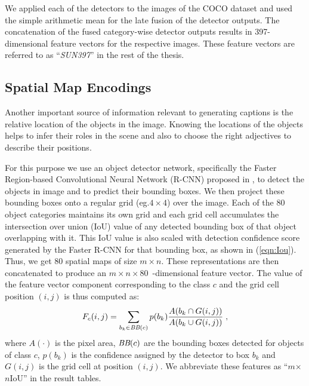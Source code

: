 We applied each of the detectors to the images of the COCO dataset and used the
simple arithmetic mean for the late fusion of the detector outputs.
The concatenation of the fused category-wise detector outputs results in
397-dimensional feature vectors for the respective images.
These feature vectors are referred to as ``\emph{SUN397}'' in the rest of the
thesis.

\subsection{Spatial Map Encodings}
\label{sec:frcnnfeat}
Another important source of information relevant to generating captions is the
relative location of the objects in the image. 
Knowing the locations of the objects helps to infer their roles in the scene and
also to choose the right adjectives to describe their positions.

For this purpose we use an object detector network, specifically the Faster
Region-based Convolutional Neural Network (R-CNN) proposed in
\cite{ren15fasterrcnn}, to detect the objects in image and to predict their
bounding boxes.
We then project these bounding boxes onto a regular grid (eg.\@ $4\times4$) over
the image. 
Each of the 80 object categories maintains its own grid and each grid cell
accumulates the intersection over union (IoU) value of any detected bounding box
of that object overlapping with it.
This IoU value is also scaled with detection confidence score generated by the
Faster R-CNN for that bounding box, as shown in (\ref{eqn:Iou}).
Thus, we get 80 spatial maps of size $m\times n$. 
These representations are then concatenated to produce an $m\times
n\times80$~-dimensional feature vector.
The value of the feature vector component corresponding to the class $c$ and the
grid cell position $(i,j)$ is thus computed as:
\begin{equation} \label{eqn:Iou} F_c(i,j) = \sum_{b_k \in \text{\it
BB}(c)}p(b_k)\frac{ A(b_k \cap G(i,j))}{A(b_k \cup G(i,j))} \;, \end{equation}
where $A(\cdot)$ is the pixel area, $\text{\it BB}(c)$ are the bounding boxes
detected for objects of class $c$, $p(b_k)$ is the confidence assigned by the
detector to box $b_k$ and $G(i,j)$ is the grid cell at position $(i,j)$.
We abbreviate these features as ``$m$$\times${}$n$IoU'' in the result tables.

